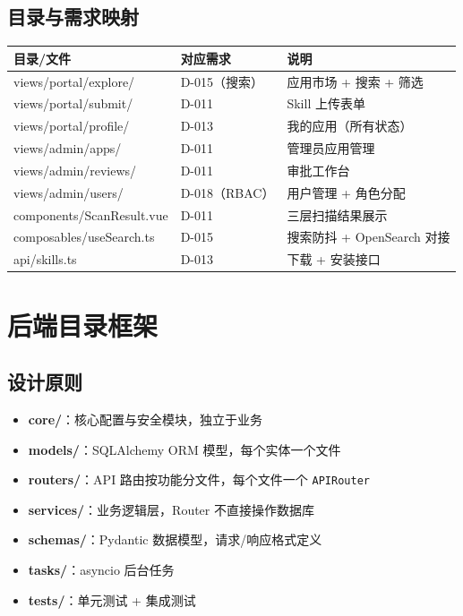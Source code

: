\documentclass[11pt,a4paper]{article}
\begin{document}
\subsection{目录与需求映射}

\begin{table}[h]
\centering
\begin{tabularx}{\linewidth}{llX}
\toprule
\textbf{目录/文件} & \textbf{对应需求} & \textbf{说明} \\
\midrule
views/portal/explore/ & D-015（搜索） & 应用市场 + 搜索 + 筛选 \\
views/portal/submit/ & D-011 & Skill 上传表单 \\
views/portal/profile/ & D-013 & 我的应用（所有状态） \\
views/admin/apps/ & D-011 & 管理员应用管理 \\
views/admin/reviews/ & D-011 & 审批工作台 \\
views/admin/users/ & D-018（RBAC） & 用户管理 + 角色分配 \\
components/ScanResult.vue & D-011 & 三层扫描结果展示 \\
composables/useSearch.ts & D-015 & 搜索防抖 + OpenSearch 对接 \\
api/skills.ts & D-013 & 下载 + 安装接口 \\
\bottomrule
\end{tabularx}
\end{table}

\section{后端目录框架}

\subsection{设计原则}

\begin{itemize}[nosep]
  \item \textbf{core/}：核心配置与安全模块，独立于业务
  \item \textbf{models/}：SQLAlchemy ORM 模型，每个实体一个文件
  \item \textbf{routers/}：API 路由按功能分文件，每个文件一个 \texttt{APIRouter}
  \item \textbf{services/}：业务逻辑层，Router 不直接操作数据库
  \item \textbf{schemas/}：Pydantic 数据模型，请求/响应格式定义
  \item \textbf{tasks/}：asyncio 后台任务
  \item \textbf{tests/}：单元测试 + 集成测试
\end{itemize}
\end{document}
